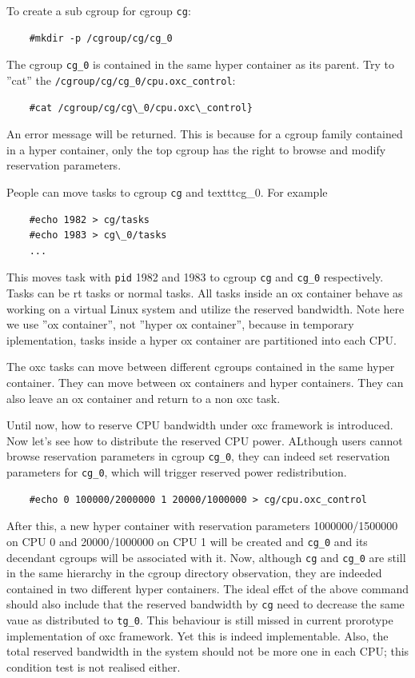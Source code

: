 To create a sub cgroup for cgroup \texttt{cg}:
\begin{lstlisting}
	#mkdir -p /cgroup/cg/cg_0
\end{lstlisting}
The cgroup \texttt{cg\_0} is contained in the same hyper container as
its parent. Try to ''cat'' the \texttt{/cgroup/cg/cg\_0/cpu.oxc\_control}: 
\begin{lstlisting}
	#cat /cgroup/cg/cg\_0/cpu.oxc\_control}
\end{lstlisting}
An error message will be returned. This is because for a cgroup family
contained in a hyper container, only the top cgroup has the right to 
browse and modify reservation parameters.

People can move tasks to cgroup \texttt{cg} and texttt{cg\_0}. For example
\begin{lstlisting}
	#echo 1982 > cg/tasks
	#echo 1983 > cg\_0/tasks
	...
\end{lstlisting}
This moves task with \texttt{pid} 1982 and 1983 to cgroup \texttt{cg} and
\texttt{cg\_0} respectively. Tasks can be rt tasks or normal tasks. All 
tasks inside an ox container behave as working on a virtual Linux system
and utilize the reserved bandwidth. Note here we use ''ox container'', not
''hyper ox container'', because in temporary iplementation, tasks inside
a hyper ox container are partitioned into each CPU. 

The oxc tasks can move between different cgroups contained in the same 
hyper container. They can move between ox containers and hyper containers.
They can also leave an ox container and return to a non oxc task.


Until now, how to reserve CPU bandwidth under oxc framework is introduced.
Now let's see how to distribute the reserved CPU power.
ALthough users cannot browse reservation parameters in cgroup
\texttt{cg\_0}, they can indeed set reservation parameters for 
\texttt{cg\_0}, which will trigger reserved power redistribution.
\begin{lstlisting}
	#echo 0 100000/2000000 1 20000/1000000 > cg/cpu.oxc_control
\end{lstlisting}
After this, a new hyper container with reservation parameters
1000000/1500000 on CPU 0 and 20000/1000000 on CPU 1 will be created
and \texttt{cg\_0} and its decendant cgroups will be associated with
it. Now, although \texttt{cg} and \texttt{cg\_0} are still in the same
hierarchy in the cgroup directory observation, they are indeeded contained
in two different hyper containers.
The ideal effct of the above command should also include that the reserved
bandwidth by \texttt{cg} need to decrease the same vaue as distributed to
\texttt{tg\_0}. This behaviour is still missed in current prorotype 
implementation of oxc framework. Yet this is indeed implementable.
Also, the total reserved bandwidth in the system should not be more one in
each CPU; this condition test is not realised either.

